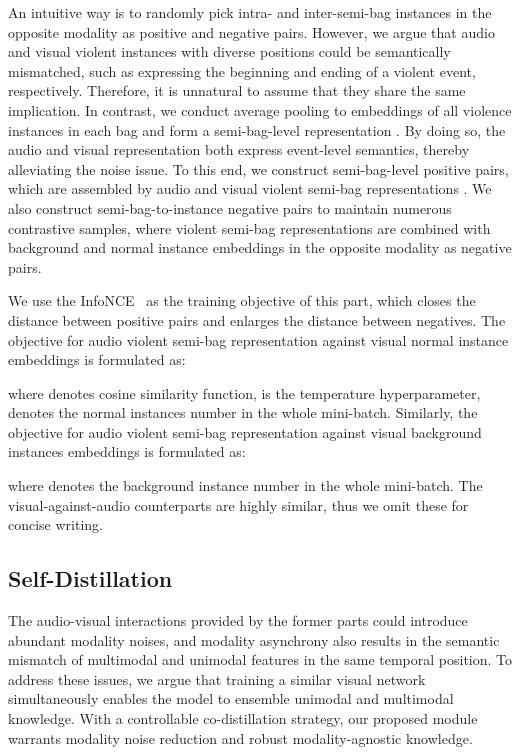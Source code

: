 \documentclass[sigconf]{acmart}
\begin{document}
An intuitive way is to randomly pick intra- and inter-semi-bag instances in the opposite modality as positive and negative pairs. However, we argue that audio and visual violent instances with diverse positions could be semantically mismatched, such as expressing the beginning and ending of a violent event, respectively. Therefore, it is unnatural to assume that they share the same implication. In contrast, we conduct average pooling to embeddings of all violence instances in each bag and form a semi-bag-level representation . By doing so, the audio and visual representation both express event-level semantics, thereby alleviating the noise issue. To this end, we construct semi-bag-level positive pairs, which are assembled by audio and visual violent semi-bag representations . We also construct semi-bag-to-instance negative pairs to maintain numerous contrastive samples, where violent semi-bag representations are combined with background and normal instance embeddings  in the opposite modality as negative pairs.

We use the InfoNCE~\cite{van2018representation} as the training objective of this part, which closes the distance between positive pairs and enlarges the distance between negatives. The objective for audio violent semi-bag representation  against visual normal instance embeddings  is formulated as:

where  denotes cosine similarity function,  is the temperature hyperparameter,  denotes the normal instances number in the whole mini-batch. Similarly, the objective for audio violent semi-bag representation  against visual background instances embeddings  is formulated as:

where  denotes the background instance number in the whole mini-batch. The visual-against-audio counterparts are highly similar, thus we omit these for concise writing.

\subsection{Self-Distillation}
The audio-visual interactions provided by the former parts could introduce abundant modality noises, and modality asynchrony also results in the semantic mismatch of multimodal and unimodal features in the same temporal position. To address these issues, we argue that training a similar visual network simultaneously enables the model to ensemble unimodal and multimodal knowledge. With a controllable co-distillation strategy, our proposed module warrants modality noise reduction and robust modality-agnostic knowledge.
\end{document}
